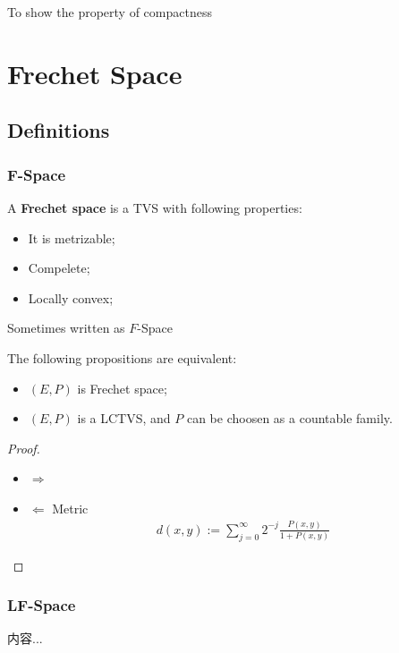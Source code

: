 \documentclass[Total.tex]{subfiles}
\begin{document}
				To show the property of compactness
	\chapter{Frechet Space}
	\section{Definitions}
	\subsection{F-Space}
	\begin{Def}
		A \textbf{Frechet space} is a TVS with following properties:
		\begin{itemize}
			\item It is metrizable;
			\item Compelete;
			\item Locally convex;
		\end{itemize}
		Sometimes written as $F$-Space
	\end{Def}
	\begin{proposition}
		The following propositions are equivalent:
		\begin{itemize}
			\item $(E,P)$ is Frechet space;
			\item $(E,P)$ is a LCTVS, and $P$ can be choosen as a countable family.
		\end{itemize}
	\end{proposition}
	\begin{proof}
		\begin{itemize}
			\item $\Rightarrow$
			\item $\Leftarrow$ Metric
			\begin{gather*}
				d(x,y):=\sum_{j=0}^\infty 2^{-j}\frac{P(x,y)}{1+P(x,y)}
			\end{gather*}
		\end{itemize}
	\end{proof}
	\subsection{LF-Space}
	\begin{Def}
		内容...
	\end{Def}
\end{document}
